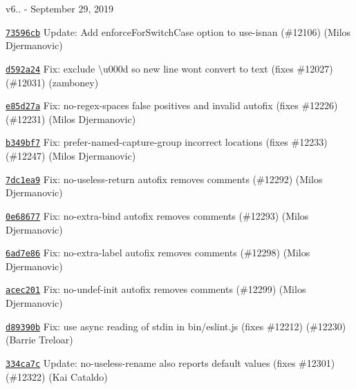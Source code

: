 v6.. -\/ September 29, 2019


\begin{DoxyItemize}
\item \href{https://github.com/eslint/eslint/commit/73596cbdf0a12e2878b2994783f9b969b0c5fbeb}{\texttt{ {\ttfamily 73596cb}}} Update\+: Add enforce\+For\+Switch\+Case option to use-\/isnan (\#12106) (Milos Djermanovic)
\item \href{https://github.com/eslint/eslint/commit/d592a248d67920f7200925c003f10853d29f1f8d}{\texttt{ {\ttfamily d592a24}}} Fix\+: exclude {\ttfamily \textbackslash{}u000d} so new line won\textquotesingle{}t convert to text (fixes \#12027) (\#12031) (zamboney)
\item \href{https://github.com/eslint/eslint/commit/e85d27af427d6185ac553a0d801b5103153426d4}{\texttt{ {\ttfamily e85d27a}}} Fix\+: no-\/regex-\/spaces false positives and invalid autofix (fixes \#12226) (\#12231) (Milos Djermanovic)
\item \href{https://github.com/eslint/eslint/commit/b349bf79ad56dded826bc99cb52c3551af34fa63}{\texttt{ {\ttfamily b349bf7}}} Fix\+: prefer-\/named-\/capture-\/group incorrect locations (fixes \#12233) (\#12247) (Milos Djermanovic)
\item \href{https://github.com/eslint/eslint/commit/7dc1ea9a1b9a21daaffcf712ba9c0e91af81b906}{\texttt{ {\ttfamily 7dc1ea9}}} Fix\+: no-\/useless-\/return autofix removes comments (\#12292) (Milos Djermanovic)
\item \href{https://github.com/eslint/eslint/commit/0e68677ec0aaf060a071ecf71e4af954dddb6af0}{\texttt{ {\ttfamily 0e68677}}} Fix\+: no-\/extra-\/bind autofix removes comments (\#12293) (Milos Djermanovic)
\item \href{https://github.com/eslint/eslint/commit/6ad7e864303e56a39c89569d50c6caf80752ee21}{\texttt{ {\ttfamily 6ad7e86}}} Fix\+: no-\/extra-\/label autofix removes comments (\#12298) (Milos Djermanovic)
\item \href{https://github.com/eslint/eslint/commit/acec201f06df780791179ad92cfc484f9b6d23d4}{\texttt{ {\ttfamily acec201}}} Fix\+: no-\/undef-\/init autofix removes comments (\#12299) (Milos Djermanovic)
\item \href{https://github.com/eslint/eslint/commit/d89390b75e3e9993f347387a49b0ac5550f45c7f}{\texttt{ {\ttfamily d89390b}}} Fix\+: use async reading of stdin in bin/eslint.\+js (fixes \#12212) (\#12230) (Barrie Treloar)
\item \href{https://github.com/eslint/eslint/commit/334ca7c8b9c18ac097849c1cefaa43097a4e51dc}{\texttt{ {\ttfamily 334ca7c}}} Update\+: no-\/useless-\/rename also reports default values (fixes \#12301) (\#12322) (Kai Cataldo)

\end{DoxyItemize}
